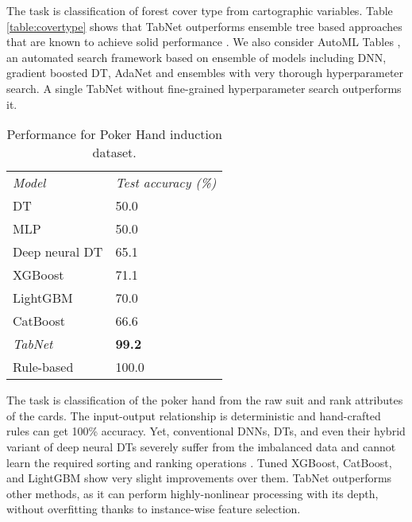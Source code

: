 \noindent{} The task is classification of forest cover type from cartographic variables. Table \ref{table:covertype} shows that TabNet outperforms ensemble tree based approaches that are known to achieve solid performance \citep{xgboost_gpu}. 
We also consider AutoML Tables \citep{automl_tables}, an automated search framework based on ensemble of models including DNN, gradient boosted DT, AdaNet \citep{adanet} and ensembles \citep{automl_tables} with very thorough hyperparameter search. %
A single TabNet without fine-grained hyperparameter search outperforms it.

\begin{table}[h!]
\vspace{0cm}
\caption{Performance for Poker Hand induction dataset.}
\vspace{0cm}
\centering
\begin{tabular}{|C{4.0 cm}|C{2.8 cm}|}
    \textit{Model} & \textit{Test accuracy (\%)}        \\ 
    DT &  50.0                \\ 
    MLP & 50.0               \\ 
    Deep neural DT  & 65.1   \\
    XGBoost &  71.1                \\  
    LightGBM &  70.0                \\  
    CatBoost &  66.6                \\ \hhline{|=|=|}
    \textit{TabNet}  & \textbf{99.2}  \\ \hhline{|=|=|}
    Rule-based  &  100.0                 \\ 
\end{tabular}
\label{table:poker}
\vspace{0cm}
\end{table}

\vspace{0cm}
\noindent{} The task is classification of the poker hand from the raw suit and rank attributes of the cards. The input-output relationship is deterministic and hand-crafted rules can get 100\% accuracy. Yet, conventional DNNs, DTs, and even their hybrid variant of deep neural DTs \cite{dndt} severely suffer from the imbalanced data and cannot learn the required sorting and ranking operations \cite{dndt}. Tuned XGBoost, CatBoost, and LightGBM show very slight improvements over them. TabNet outperforms other methods, as it can perform highly-nonlinear processing with its depth, without overfitting thanks to instance-wise feature selection.

